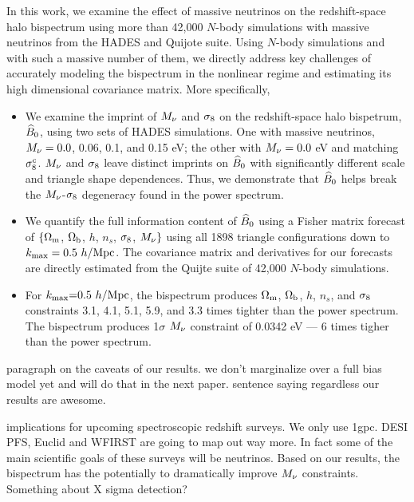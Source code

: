In this work, we examine the effect of massive neutrinos on the redshift-space 
halo bispectrum using more than 42,000 $N$-body simulations with massive neutrinos
from the HADES and Quijote suite. Using $N$-body simulations and with such a massive 
number of them, we directly address key challenges of accurately modeling the 
bispectrum in the nonlinear regime and estimating its high dimensional covariance 
matrix. More specifically, 
\begin{itemize}
    \item We examine the imprint of $M_\nu$ and $\sigma_8$ on the redshift-space halo bispetrum, 
        $\widehat{B}_0$, using two sets of HADES simulations. One with massive neutrinos, $M_\nu = 0.0$, 0.06, 
        0.1, and 0.15 eV; the other with $M_\nu = 0.0$ eV and matching $\sigma_8^{c}$. 
        $M_\nu$ and $\sigma_8$ leave distinct imprints on $\widehat{B}_0$ with significantly different 
        scale and triangle shape dependences. Thus, we demonstrate that $\widehat{B}_0$ helps 
        break the $M_\nu$-$\sigma_8$ degeneracy found in the power spectrum. 
    \item We quantify the full information content of $\widehat{B}_0$ using a Fisher matrix forecast of 
        $\{\Omega_{\rm m}$, $\Omega_{\rm b}$, $h$, $n_s$, $\sigma_8$, $M_\nu\}$ using all 1898 triangle configurations
        down to $k_{\rm max} = 0.5~h/{\rm Mpc}$. The covariance matrix and derivatives for our forecasts 
        are directly estimated from the Quijte suite of 42,000 $N$-body simulations. 
    \item For $k_{\rm max}{=}0.5~h/{\rm Mpc}$, the bispectrum produces $\Omega_{\rm m}$, $\Omega_{\rm b}$, $h$, $n_s$, and 
        $\sigma_8$ constraints 3.1, 4.1, 5.1, 5.9, and 3.3 times tighter than the power spectrum. 
        The bispectrum produces 1$\sigma$ $M_\nu$ constraint of 0.0342 eV --- 6 times tigher 
        than the power spectrum.
\end{itemize}

paragraph on the caveats of our results. 
we don't marginalize over a full bias model yet and will do that in the next paper. 
sentence saying regardless our results are awesome.

implications for upcoming spectroscopic redshift surveys. We only use 1gpc. DESI PFS, Euclid and WFIRST are going to map out way more. In fact some of the main scientific goals of these surveys will be neutrinos. Based on our results, the bispectrum has the potentially to dramatically improve $M_\nu$ constraints. Something about X sigma detection?  

